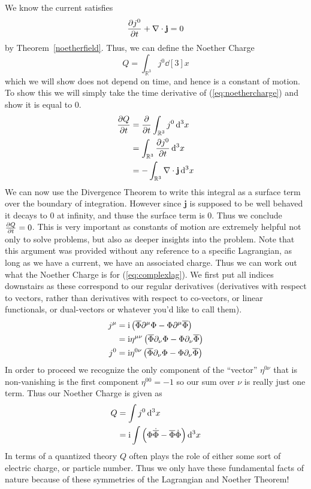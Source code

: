 We know the current satisfies
\begin{equation}
    \pdv{j^0}{t} + \nabla\cdot\mathbf{j} = 0
\end{equation}
by Theorem~\ref{noetherfield}. Thus, we can define the Noether Charge
\begin{equation}\label{eq:noethercharge}
    Q = \int_{\mathbb{R}^3}j^0\dd[3]{x}
\end{equation}
which we will show does not depend on time, and hence is a constant of motion.
To show this we will simply take the time derivative of (\ref{eq:noethercharge})
and show it is equal to 0.
\begin{align}
    \pdv{Q}{t} & = \pdv{t}\int_{\mathbb{R}^3}j^0\dd[3]{x} \\
               & = \int_{\mathbb{R}^3}\pdv{j^0}{t}\dd[3]{x} \\
               & = -\int_{\mathbb{R}^3}\nabla\cdot\mathbf{j}\dd[3]{x}
\end{align}
We can now use the Divergence Theorem to write this integral as a surface term
over the boundary of integration. However since \(\mathbf{j}\) is supposed to be
well behaved it decays to 0 at infinity, and thuse the surface term is 0. Thus
we conclude \(\pdv{Q}{t} = 0\). This is very important as constants of motion
are extremely helpful not only to solve problems, but also as deeper insights
into the problem. Note that this argument was provided without any reference to
a specific Lagrangian, as long as we have a current, we have an associated
charge. Thus we can work out what the Noether Charge is for
(\ref{eq:complexlag}). We first put all indices downstairs as these correspond
to our regular derivatives (derivatives with respect to vectors, rather than
derivatives with respect to co-vectors, or linear functionals, or dual-vectors
or whatever you'd like to call them).
\begin{align}
    j^\mu & = \mathrm{i}\left(\overline{\Phi}\partial^\mu\Phi - \Phi\partial^\mu\overline{\Phi}\right) \\
          & = \mathrm{i}\eta^{\mu\nu}\left(\overline{\Phi}\partial_\nu\Phi - \Phi\partial_\nu\overline{\Phi}\right) \\
    j^0   & = \mathrm{i}\eta^{0\nu}\left(\overline{\Phi}\partial_\nu\Phi - \Phi\partial_\nu\overline{\Phi}\right)
\end{align}
In order to proceed we recognize the only component of the ``vector''
\(\eta^{0\nu}\) that is non-vanishing is the first component \(\eta^{00} = -1\)
so our sum over \(\nu\) is really just one term. Thus our Noether Charge is
given as
\begin{align}
    Q & = \int j^0\dd[3]{x} \\
      & = \mathrm{i}\int\left(\Phi\dot{\overline{\Phi}} - \overline{\Phi}\dot{\Phi}\right)\dd[3]{x}\label{eq:charge}
\end{align}
In terms of a quantized theory \(Q\) often plays the role of either some sort of
electric charge, or particle number. Thus we only have these fundamental facts
of nature because of these symmetries of the Lagrangian and Noether Theorem!


